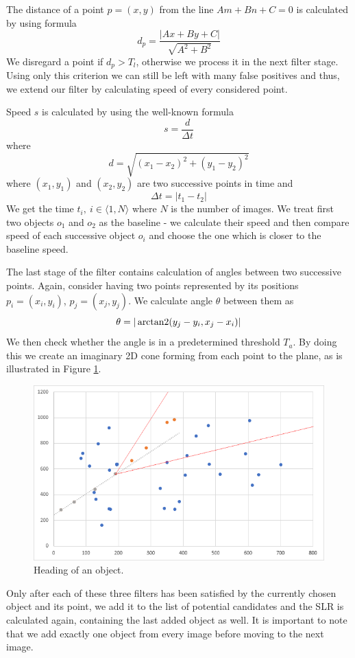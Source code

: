 	The distance of a point $p=(x,y)$ from the line $Am+Bn+C=0$ is calculated by using formula $$d_p=\frac{|Ax+By+C|}{\sqrt{A^2+B^2}}$$ We disregard a point if $d_p>T_l$, otherwise we process it in the next filter stage. Using only this criterion we can still be left with many false positives and thus, we extend our filter by calculating speed of every considered point. 
	
	Speed $s$ is calculated by using the well-known formula $$s=\frac{d}{{\Delta}t}$$ where $$d=\sqrt{(x_1-x_2)^2 + (y_1-y_2)^2}$$ where $(x_1,y_1)$ and $(x_2,y_2)$ are two successive points in time and $${\Delta}t=|t_1-t_2|$$ We get the time $t_{i},\ i\in\langle1,N\rangle$ where $N$ is the number of images. We treat first two objects $o_1$ and $o_2$ as the baseline - we calculate their speed and then compare speed of each successive object $o_i$ and choose the one which is closer to the baseline speed.
	
	The last stage of the filter contains calculation of angles between two successive points. Again, consider having two points represented by its positions $p_{i}=(x_i,y_i)$, $p_j=(x_j,y_j)$. We calculate angle $\theta$ between them as $$\theta=|\operatorname{arctan2}(y_j-y_i, x_j-x_i)|$$ We then check whether the angle is in a predetermined threshold $T_a$. By doing this we create an imaginary 2D cone forming from each point to the plane, as is illustrated in Figure \ref{fig:regresia2}.
	
	\begin{figure}[H]
	\centering
	  \includegraphics[width=12cm]{images/regresia2}
		  \caption{Heading of an object.}
	  \label{fig:regresia2}
	\end{figure}
	
	Only after each of these three filters has been satisfied by the currently chosen object and its point, we add it to the list of potential candidates and the SLR is calculated again, containing the last added object as well. It is important to note that we add exactly one object from every image before moving to the next image.
	
